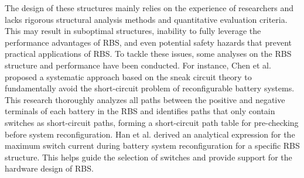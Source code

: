 \documentclass{article}
\begin{document}
{%
The design of these structures mainly relies on the experience of researchers and lacks rigorous structural analysis methods and quantitative evaluation criteria. 
This may result in suboptimal structures, inability to fully leverage the performance advantages of RBS, and even potential safety hazards that prevent practical applications of RBS. 
To tackle these issues, some analyses on the RBS structure and performance have been conducted. 
For instance, Chen et al.\cite{chenSneakCircuitTheory2021} proposed a systematic approach based on the sneak circuit theory to fundamentally avoid the short-circuit problem of reconfigurable battery systems. 
This research thoroughly analyzes all paths between the positive and negative terminals of each battery in the RBS and identifies paths that only contain switches as short-circuit paths, forming a short-circuit path table for pre-checking before system reconfiguration. 
Han et al.\cite{han2021analysis} derived an analytical expression for the maximum switch current during battery system reconfiguration for a specific RBS structure. 
This helps guide the selection of switches and provide support for the hardware design of RBS.
}
\end{document}
